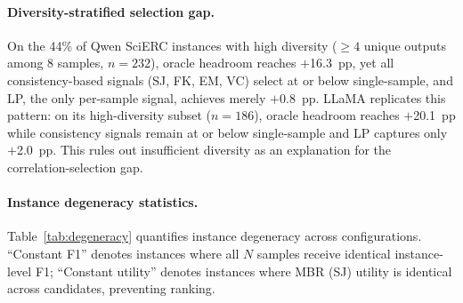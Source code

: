 \paragraph{Diversity-stratified selection gap.}
On the 44\% of Qwen SciERC instances with high diversity (${\geq}4$ unique outputs among 8 samples, $n{=}232$), oracle headroom reaches $+$16.3~pp, yet all consistency-based signals (SJ, FK, EM, VC) select at or below single-sample, and LP, the only per-sample signal, achieves merely $+$0.8~pp.
LLaMA replicates this pattern: on its high-diversity subset ($n{=}186$), oracle headroom reaches $+$20.1~pp while consistency signals remain at or below single-sample and LP captures only $+$2.0~pp.
This rules out insufficient diversity as an explanation for the correlation-selection gap.

\paragraph{Instance degeneracy statistics.}
Table~\ref{tab:degeneracy} quantifies instance degeneracy across configurations. ``Constant F1'' denotes instances where all $N$ samples receive identical instance-level F1; ``Constant utility'' denotes instances where MBR (SJ) utility is identical across candidates, preventing ranking.

\begin{table}[t]
\centering
\small
\caption{Instance degeneracy statistics ($T{=}1.0$). ``Constant F1'': all $N$ samples receive identical instance-level F1. ``Constant utility'': MBR (SJ) utility identical across candidates. 4B data confirms degeneracy scales with model capability.}
\label{tab:degeneracy}
\end{table}


